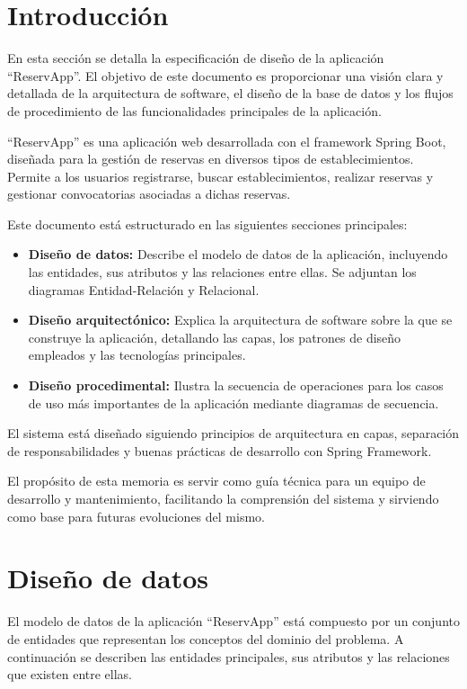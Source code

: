 
\section{Introducción}

En esta sección se detalla la especificación de diseño de la aplicación ``ReservApp''. El objetivo de este documento es proporcionar una visión clara y detallada de la arquitectura de software, el diseño de la base de datos y los flujos de procedimiento de las funcionalidades principales de la aplicación.

``ReservApp'' es una aplicación web desarrollada con el framework Spring Boot, diseñada para la gestión de reservas en diversos tipos de establecimientos. Permite a los usuarios registrarse, buscar establecimientos, realizar reservas y gestionar convocatorias asociadas a dichas reservas.

Este documento está estructurado en las siguientes secciones principales:
\begin{itemize}
    \item \textbf{Diseño de datos:} Describe el modelo de datos de la aplicación, incluyendo las entidades, sus atributos y las relaciones entre ellas. Se adjuntan los diagramas Entidad-Relación y Relacional.
    \item \textbf{Diseño arquitectónico:} Explica la arquitectura de software sobre la que se construye la aplicación, detallando las capas, los patrones de diseño empleados y las tecnologías principales.
    \item \textbf{Diseño procedimental:} Ilustra la secuencia de operaciones para los casos de uso más importantes de la aplicación mediante diagramas de secuencia.
\end{itemize}

El sistema está diseñado siguiendo principios de arquitectura en capas, separación de responsabilidades y buenas prácticas de desarrollo con Spring Framework.

El propósito de esta memoria es servir como guía técnica para un equipo de desarrollo y mantenimiento, facilitando la comprensión del sistema y sirviendo como base para futuras evoluciones del mismo.

\section{Diseño de datos}

El modelo de datos de la aplicación ``ReservApp'' está compuesto por un conjunto de entidades que representan los conceptos del dominio del problema. A continuación se describen las entidades principales, sus atributos y las relaciones que existen entre ellas.

